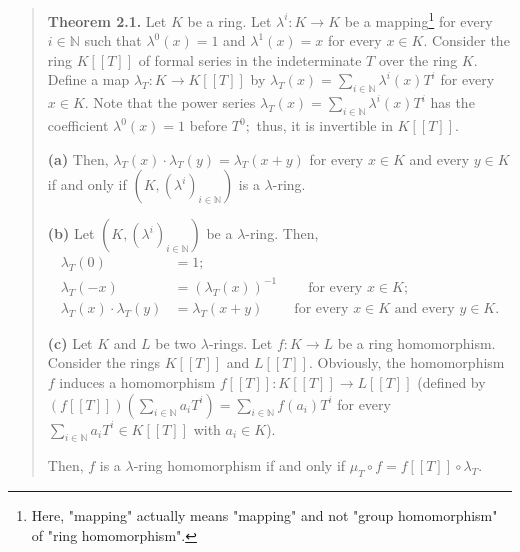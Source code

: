 \documentclass[12pt,final,notitlepage,onecolumn,german]{article}%
\begin{document}
\begin{quote}
\textbf{Theorem 2.1.} Let $K$ be a ring. Let $\lambda^{i}:K\rightarrow K$ be a
mapping\footnote{Here, "mapping" actually means "mapping" and not "group
homomorphism" of "ring homomorphism".} for every $i\in\mathbb{N}$ such that
$\lambda^{0}\left(  x\right)  =1$ and $\lambda^{1}\left(  x\right)  =x$ for
every $x\in K$. Consider the ring $K\left[  \left[  T\right]  \right]  $ of
formal series in the indeterminate $T$ over the ring $K.$ Define a map
$\lambda_{T}:K\rightarrow K\left[  \left[  T\right]  \right]  $ by
$\lambda_{T}\left(  x\right)  =\sum\limits_{i\in\mathbb{N}}\lambda^{i}\left(
x\right)  T^{i}$ for every $x\in K$. Note that the power series $\lambda
_{T}\left(  x\right)  =\sum\limits_{i\in\mathbb{N}}\lambda^{i}\left(
x\right)  T^{i}$ has the coefficient $\lambda^{0}\left(  x\right)  =1$ before
$T^{0};$ thus, it is invertible in $K\left[  \left[  T\right]  \right]  $.

\textbf{(a)} Then, $\lambda_{T}\left(  x\right)  \cdot\lambda_{T}\left(
y\right)  =\lambda_{T}\left(  x+y\right)  $ for every $x\in K$ and every $y\in
K$ if and only if $\left(  K,\left(  \lambda^{i}\right)  _{i\in\mathbb{N}%
}\right)  $ is a $\lambda$-ring.

\textbf{(b)} Let $\left(  K,\left(  \lambda^{i}\right)  _{i\in\mathbb{N}%
}\right)  $ be a $\lambda$-ring. Then,%
\begin{align*}
\lambda_{T}\left(  0\right)   &  =1;\\
\lambda_{T}\left(  -x\right)   &  =\left(  \lambda_{T}\left(  x\right)
\right)  ^{-1}\ \ \ \ \ \ \ \ \ \ \text{for every }x\in K;\\
\lambda_{T}\left(  x\right)  \cdot\lambda_{T}\left(  y\right)   &
=\lambda_{T}\left(  x+y\right)  \ \ \ \ \ \ \ \ \ \ \text{for every }x\in
K\text{ and every }y\in K.
\end{align*}


\textbf{(c)} Let $K$ and $L$ be two $\lambda$-rings. Let $f:K\rightarrow L$ be
a ring homomorphism. Consider the rings $K\left[  \left[  T\right]  \right]  $
and $L\left[  \left[  T\right]  \right]  $. Obviously, the homomorphism $f$
induces a homomorphism $f\left[  \left[  T\right]  \right]  :K\left[  \left[
T\right]  \right]  \rightarrow L\left[  \left[  T\right]  \right]  $ (defined
by $\left(  f\left[  \left[  T\right]  \right]  \right)  \left(
\sum\limits_{i\in\mathbb{N}}a_{i}T^{i}\right)  =\sum\limits_{i\in\mathbb{N}%
}f\left(  a_{i}\right)  T^{i}$ for every $\sum\limits_{i\in\mathbb{N}}%
a_{i}T^{i}\in K\left[  \left[  T\right]  \right]  $ with $a_{i}\in K$).

Then, $f$ is a $\lambda$-ring homomorphism if and only if $\mu_{T}\circ
f=f\left[  \left[  T\right]  \right]  \circ\lambda_{T}.$
\end{quote}
\end{document}
